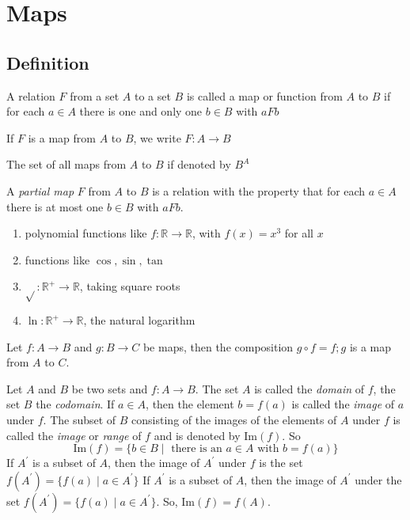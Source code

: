 \section{Maps}
\subsection{Definition}
\begin{definition}
    A relation $F$ from a set $A$ to a set $B$ is called a map or function from $A$ to $B$
    if for each $a \in A$ there is one and only one $b \in B$ with $aFb$
    \par If $F$ is a map from $A$ to $B$, we write $F: A \rightarrow B$
    \par The set of all maps from $A$ to $B$ if denoted by $B^A$
    \par A \emph{partial map} $F$ from $A$ to $B$ is a relation with the property
    that for each $a \in A$ there is at most one $b \in B$ with $aFb$.
\end{definition}

\begin{example}
    \begin{enumerate}
        \item polynomial functions like $ f:\mathbb{R} \to \mathbb{R} $,
         with $ f(x) = x^3 $ for all $x$
        \item functions like $ \cos, \sin, \tan $
        \item $ \sqrt{}:\mathbb{R^+} \to \mathbb{R} $, taking square roots
        \item $ \ln:\mathbb{R^+} \to \mathbb{R} $, the natural logarithm
    \end{enumerate}
\end{example}

\begin{proposition}
    Let $ f: A \to B $ and $ g: B \to C $ be maps, then the composition
    $ g \circ f = f;g $ is a map from $A$ to $C$.
\end{proposition}

Let $A$ and $B$ be two sets and $ f:A \to B $. The set $A$ is called the
\emph{domain} of $f$, the set $B$ the \emph{codomain}. If $ a \in A $, then
the element $ b = f(a) $ is called the \emph{image} of $a$ under $f$.
The subset of $B$ consisting of the images of the elements of $A$ under $f$
is called the \emph{image} or \emph{range} of $f$ and is denoted by $\text{Im}(f)$. So
$$ \text{Im}(f) = \{b \in B \mid \text{ there is an } a \in A \text{ with } b = f(a)\} $$
If $ A^\prime $ is a subset of $A$, then the image of $A^\prime$ under $f$ is the set
$ f(A^\prime) =\{f(a) \mid a \in A^\prime\}$
If $ A^\prime $ is a subset of $A$, then the image of $ A^\prime $ under the set
$ f(A^\prime) =\{f(a) \mid a \in A^\prime\} $. So, $ \text{Im}(f) = f(A) $.


